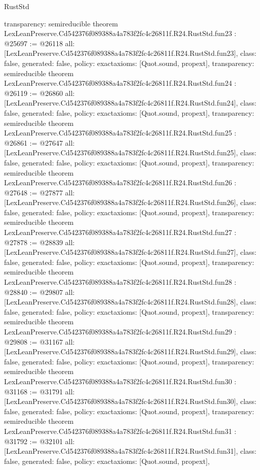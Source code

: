 \begin{lexlean}{RustStd}
\begin{coremodule}
{  transparency: semireducible
}
theorem LexLeanPreserve.Cd542376f089388a4a783f2fc4c26811f.R24.RustStd.fun23 : @25697 := @26118 {
  all: [LexLeanPreserve.Cd542376f089388a4a783f2fc4c26811f.R24.RustStd.fun23],
  class: false,
  generated: false,
  policy: exact{axioms: [Quot.sound, propext]},
  transparency: semireducible
}
theorem LexLeanPreserve.Cd542376f089388a4a783f2fc4c26811f.R24.RustStd.fun24 : @26119 := @26860 {
  all: [LexLeanPreserve.Cd542376f089388a4a783f2fc4c26811f.R24.RustStd.fun24],
  class: false,
  generated: false,
  policy: exact{axioms: [Quot.sound, propext]},
  transparency: semireducible
}
theorem LexLeanPreserve.Cd542376f089388a4a783f2fc4c26811f.R24.RustStd.fun25 : @26861 := @27647 {
  all: [LexLeanPreserve.Cd542376f089388a4a783f2fc4c26811f.R24.RustStd.fun25],
  class: false,
  generated: false,
  policy: exact{axioms: [Quot.sound, propext]},
  transparency: semireducible
}
theorem LexLeanPreserve.Cd542376f089388a4a783f2fc4c26811f.R24.RustStd.fun26 : @27648 := @27877 {
  all: [LexLeanPreserve.Cd542376f089388a4a783f2fc4c26811f.R24.RustStd.fun26],
  class: false,
  generated: false,
  policy: exact{axioms: [Quot.sound, propext]},
  transparency: semireducible
}
theorem LexLeanPreserve.Cd542376f089388a4a783f2fc4c26811f.R24.RustStd.fun27 : @27878 := @28839 {
  all: [LexLeanPreserve.Cd542376f089388a4a783f2fc4c26811f.R24.RustStd.fun27],
  class: false,
  generated: false,
  policy: exact{axioms: [Quot.sound, propext]},
  transparency: semireducible
}
theorem LexLeanPreserve.Cd542376f089388a4a783f2fc4c26811f.R24.RustStd.fun28 : @28840 := @29807 {
  all: [LexLeanPreserve.Cd542376f089388a4a783f2fc4c26811f.R24.RustStd.fun28],
  class: false,
  generated: false,
  policy: exact{axioms: [Quot.sound, propext]},
  transparency: semireducible
}
theorem LexLeanPreserve.Cd542376f089388a4a783f2fc4c26811f.R24.RustStd.fun29 : @29808 := @31167 {
  all: [LexLeanPreserve.Cd542376f089388a4a783f2fc4c26811f.R24.RustStd.fun29],
  class: false,
  generated: false,
  policy: exact{axioms: [Quot.sound, propext]},
  transparency: semireducible
}
theorem LexLeanPreserve.Cd542376f089388a4a783f2fc4c26811f.R24.RustStd.fun30 : @31168 := @31791 {
  all: [LexLeanPreserve.Cd542376f089388a4a783f2fc4c26811f.R24.RustStd.fun30],
  class: false,
  generated: false,
  policy: exact{axioms: [Quot.sound, propext]},
  transparency: semireducible
}
theorem LexLeanPreserve.Cd542376f089388a4a783f2fc4c26811f.R24.RustStd.fun31 : @31792 := @32101 {
  all: [LexLeanPreserve.Cd542376f089388a4a783f2fc4c26811f.R24.RustStd.fun31],
  class: false,
  generated: false,
  policy: exact{axioms: [Quot.sound, propext]},
}
\end{coremodule}
\end{lexlean}
